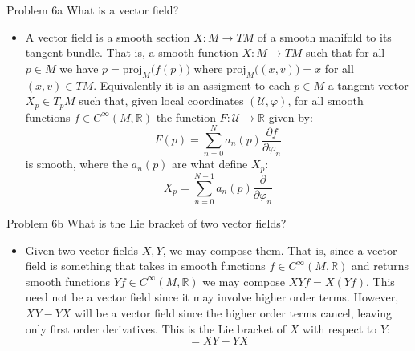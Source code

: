 \documentclass{beamer}
\begin{document}
    \begin{frame}{Problem 6a}
        What is a vector field?
        \begin{itemize}
            \item A vector field is a smooth section $X:M\rightarrow{TM}$ of a
                smooth manifold to its tangent bundle. That is, a smooth
                function $X:M\rightarrow{TM}$ such that for all $p\in{M}$ we
                have $p=\textrm{proj}_{M}\big(f(p)\big)$ where
                $\textrm{proj}_{M}\big((x,v)\big)=x$ for all
                $(x,v)\in{TM}$. Equivalently it is an assigment to each
                $p\in{M}$ a tangent vector $X_{p}\in{T}_{p}M$ such that, given
                local coordinates $(\mathcal{U},\varphi)$, for all smooth
                functions $f\in{C}^{\infty}(M,\mathbb{R})$ the function
                $F:\mathcal{U}\rightarrow\mathbb{R}$ given by:
                \begin{equation}
                    F(p)=\sum_{n=0}^{N}a_{n}(p)
                        \frac{\partial{f}}{\partial\varphi_{n}}
                \end{equation}
                is smooth, where the $a_{n}(p)$ are what define $X_{p}$:
                \begin{equation}
                    X_{p}=\sum_{n=0}^{N-1}a_{n}(p)
                        \frac{\partial}{\partial\varphi_{n}}
                \end{equation}
        \end{itemize}
    \end{frame}
    \begin{frame}{Problem 6b}
        What is the Lie bracket of two vector fields?
        \begin{itemize}
            \item Given two vector fields $X,Y$, we may compose them. That is,
                since a vector field is something that takes in smooth functions
                $f\in{C}^{\infty}(M,\mathbb{R})$ and returns smooth functions
                $Yf\in{C}^{\infty}(M,\mathbb{R})$ we may compose
                $XYf=X(Yf)$. This need not be a vector field since it may
                involve higher order terms. However, $XY-YX$ will be a
                vector field since the higher order terms cancel, leaving only
                first order derivatives. This is the Lie bracket of $X$ with
                respect to $Y$:
                \begin{equation}
                    [X,Y]=XY-YX
                \end{equation}
        \end{itemize}
    \end{frame}
\end{document}
